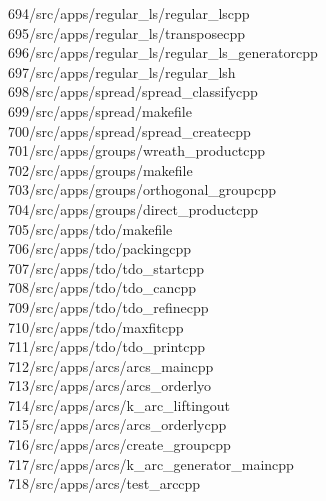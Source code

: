 \begin{tabbing}
694\>/src/apps/regular\_ls/regular\_lscpp\\[0pt]
695\>/src/apps/regular\_ls/transposecpp\\[0pt]
696\>/src/apps/regular\_ls/regular\_ls\_generatorcpp\\[0pt]
697\>/src/apps/regular\_ls/regular\_lsh\\[0pt]
698\>/src/apps/spread/spread\_classifycpp\\[0pt]
699\>/src/apps/spread/makefile\\[0pt]
700\>/src/apps/spread/spread\_createcpp\\[0pt]
701\>/src/apps/groups/wreath\_productcpp\\[0pt]
702\>/src/apps/groups/makefile\\[0pt]
703\>/src/apps/groups/orthogonal\_groupcpp\\[0pt]
704\>/src/apps/groups/direct\_productcpp\\[0pt]
705\>/src/apps/tdo/makefile\\[0pt]
706\>/src/apps/tdo/packingcpp\\[0pt]
707\>/src/apps/tdo/tdo\_startcpp\\[0pt]
708\>/src/apps/tdo/tdo\_cancpp\\[0pt]
709\>/src/apps/tdo/tdo\_refinecpp\\[0pt]
710\>/src/apps/tdo/maxfitcpp\\[0pt]
711\>/src/apps/tdo/tdo\_printcpp\\[0pt]
712\>/src/apps/arcs/arcs\_maincpp\\[0pt]
713\>/src/apps/arcs/arcs\_orderlyo\\[0pt]
714\>/src/apps/arcs/k\_arc\_liftingout\\[0pt]
715\>/src/apps/arcs/arcs\_orderlycpp\\[0pt]
716\>/src/apps/arcs/create\_groupcpp\\[0pt]
717\>/src/apps/arcs/k\_arc\_generator\_maincpp\\[0pt]
718\>/src/apps/arcs/test\_arccpp\\[0pt]

\end{tabbing}
